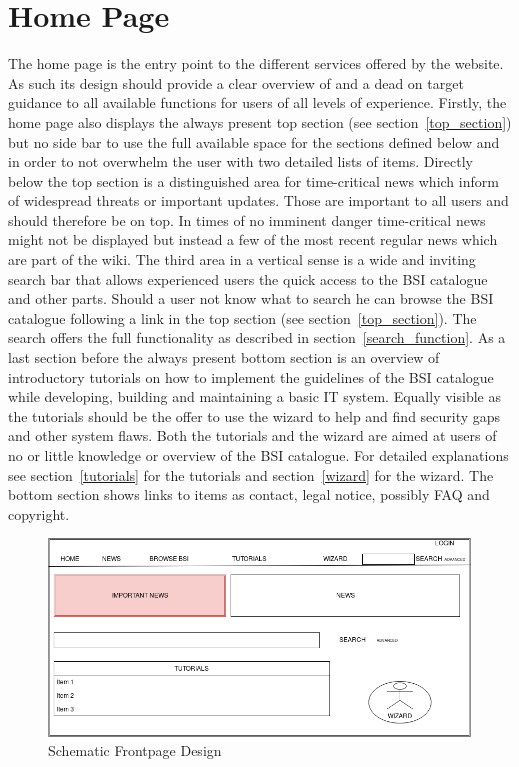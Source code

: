 \section{Home Page}
The home page is the entry point to the different services offered by the website. 
As such its design should provide a clear overview of and a dead on target guidance to all available functions for users of all levels of experience.
Firstly, the home page also displays the always present top section (see section~\ref{top_section}) but no side bar to use the full available space for the sections defined below and in order to not overwhelm the user with two detailed lists of items.
Directly below the top section is a distinguished area for time-critical news which inform of widespread threats or important updates.
Those are important to all users and should therefore be on top.
In times of no imminent danger time-critical news might not be displayed but instead a few of the most recent regular news which are part of the wiki.
The third area in a vertical sense is a wide and inviting search bar that allows experienced users the quick access to the BSI catalogue and other parts. 
Should a user not know what to search he can browse the BSI catalogue following a link in the top section (see section~\ref{top_section}).
The search offers the full functionality as described in section~\ref{search_function}.
As a last section before the always present bottom section is an overview of introductory tutorials on how to implement the guidelines of the BSI catalogue while developing, building and maintaining a basic IT system.
Equally visible as the tutorials should be the offer to use the wizard to help and find security gaps and other system flaws.
Both the tutorials and the wizard are aimed at users of no or little knowledge or overview of the BSI catalogue.
For detailed explanations see section~\ref{tutorials} for the tutorials and section~\ref{wizard} for the wizard.
The bottom section shows links to items as contact, legal notice, possibly FAQ and copyright.

\begin{figure}[h]
    \centering
    \includegraphics[scale=0.3]{Pictures/frontpage_mockup}
    \caption{Schematic Frontpage Design}
\end{figure}
 
